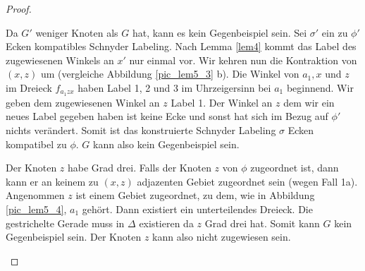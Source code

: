 \begin{proof}
\begin{description}[leftmargin =0pt, font = \bfseries]
Da $G'$ weniger Knoten als $G$ hat, kann es kein Gegenbeispiel sein. Sei $\sigma'$ ein zu $\phi'$ Ecken kompatibles Schnyder Labeling. Nach Lemma \ref{lem4} kommt das Label des zugewiesenen Winkels an $x'$ nur einmal vor. Wir kehren nun die Kontraktion von $(x,z)$ um (vergleiche Abbildung \ref{pic_lem5_3} b). Die Winkel von $a_1,x$ und $z$ im Dreieck $f_{a_1zx}$ haben Label 1, 2 und 3 im Uhrzeigersinn bei $a_1$ beginnend. Wir geben dem zugewiesenen Winkel an $z$ Label 1. Der Winkel an $z$ dem wir ein neues Label gegeben haben ist keine Ecke und sonst hat sich im Bezug auf $\phi'$ nichts verändert. Somit ist das konstruierte Schnyder Labeling $\sigma$ Ecken kompatibel zu $\phi$. $G$ kann also kein Gegenbeispiel sein.
\item[Fall 1b)] Der Knoten $z$ habe Grad drei. Falls der Knoten $z$ von $\phi$ zugeordnet ist, dann kann er an keinem zu $(x,z)$ adjazenten Gebiet zugeordnet sein (wegen Fall 1a). Angenommen $z$ ist einem Gebiet zugeordnet, zu dem, wie in Abbildung \ref{pic_lem5_4}, $a_1$ gehört. Dann existiert ein unterteilendes Dreieck. Die gestrichelte Gerade muss in $\Delta$ existieren da $z$ Grad drei hat. Somit kann $G$ kein Gegenbeispiel sein. Der Knoten $z$ kann also nicht zugewiesen sein.


\end{description}
\end{proof}
